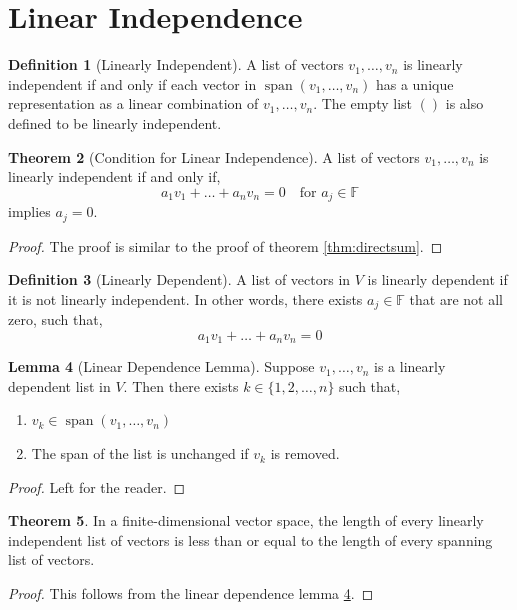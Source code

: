 \documentclass[12pt]{report}
\numberwithin{equation}{section}
\theoremstyle{definition}
\newtheorem{theorem}{Theorem}[section]
\newtheorem{definition}[theorem]{Definition}
\newtheorem{lemma}[theorem]{Lemma}
\DeclareMathOperator{\spann}{span}
\begin{document}
\section{Linear Independence}

\begin{definition}[Linearly Independent]
	A list of vectors $ v_1, \dots, v_n $ is linearly independent if and only if each vector in $ \spann (v_1, \dots, v_n)  $ has a unique representation as a linear combination of $ v_1, \dots, v_n $. The empty list $ () $ is also defined to be linearly independent.
	\label{def:li}
\end{definition}

\begin{theorem}[Condition for Linear Independence]
	A list of vectors $ v_1, \dots, v_n $ is linearly independent if and only if,
	\begin{equation}
		a_1v_1 + \dots + a_nv_n=0 \quad \text{for }a_j\in \mathbb{F}
	\end{equation}
	implies $ a_j =0 $.
\end{theorem}
\begin{proof}
	The proof is similar to the proof of theorem \ref{thm:directsum}.
\end{proof}

\begin{definition}[Linearly Dependent]
	A list of vectors in $ V $ is linearly dependent if it is not linearly independent. In other words, there exists $ a_j\in \mathbb{F} $ that are not all zero, such that,
	\begin{equation}
			 a_1v_1 + \dots + a_nv_n=0
	\end{equation}
\end{definition}

\begin{lemma}[Linear Dependence Lemma]
	Suppose $ v_1, \dots, v_n $ is a linearly dependent list in $ V $. Then there exists $ k\in\{1, 2, \dots, n\} $ such that,
	\begin{enumerate}
		\item $ v_k\in \spann(v_1, \dots, v_n ) $
		\item The span of the list is unchanged if $ v_k $ is removed.
	\end{enumerate}
	\label{lemma:ld}
\end{lemma}
\begin{proof}
	Left for the reader.
\end{proof}

\begin{theorem}
	In a finite-dimensional vector space, the length of every linearly independent list of vectors is less than or equal to the length of every spanning list of vectors.
	\label{thm:li_length}
\end{theorem}
\begin{proof}
	This follows from the linear dependence lemma \ref{lemma:ld}.
\end{proof}
\end{document}

